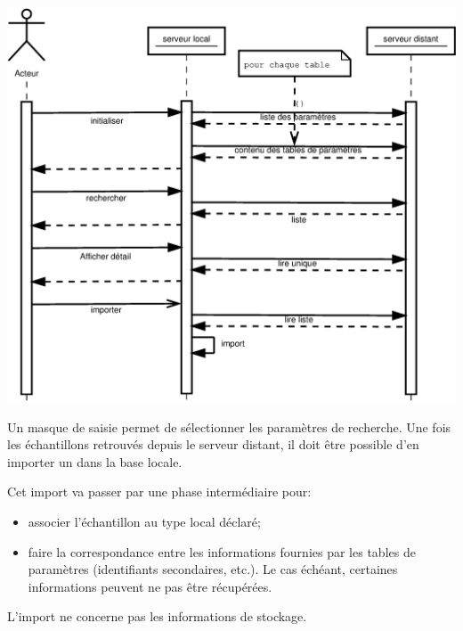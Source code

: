 \includegraphics[width=\linewidth]{images/sequence_dans_collec}

Un masque de saisie permet de sélectionner les paramètres de recherche. Une fois les échantillons retrouvés depuis le serveur distant, il doit être possible d'en importer un dans la base locale.

Cet import va passer par une phase intermédiaire pour:
\begin{itemize}
\item associer l'échantillon au type local déclaré;
\item faire la correspondance entre les informations fournies par les tables de paramètres (identifiants secondaires, etc.). Le cas échéant, certaines informations peuvent ne pas être récupérées.
\end{itemize}

L'import ne concerne pas les informations de stockage.
